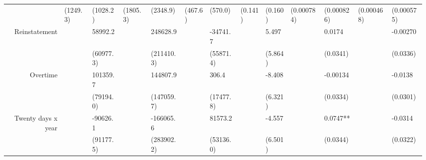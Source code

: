 \begin{tabular}{rrrrrrrrrrrrr}
      & \multicolumn{1}{l}{(1249.3)} & \multicolumn{1}{l}{(1028.2)} & \multicolumn{1}{l}{(1805.3)} & \multicolumn{1}{l}{(2348.9)} & \multicolumn{1}{l}{(467.6)} & \multicolumn{1}{l}{(570.0)} & \multicolumn{1}{l}{(0.141)} & \multicolumn{1}{l}{(0.160)} & \multicolumn{1}{l}{(0.000784)} & \multicolumn{1}{l}{(0.000826)} & \multicolumn{1}{l}{(0.000468)} & \multicolumn{1}{l}{(0.000575)} \\
Reinstatement & \multicolumn{1}{l}{} & \multicolumn{1}{l}{58992.2} & \multicolumn{1}{l}{} & \multicolumn{1}{l}{248628.9} & \multicolumn{1}{l}{} & \multicolumn{1}{l}{-34741.7} & \multicolumn{1}{l}{} & \multicolumn{1}{l}{5.497} & \multicolumn{1}{l}{} & \multicolumn{1}{l}{0.0174} & \multicolumn{1}{l}{} & \multicolumn{1}{l}{-0.00270} \\
      & \multicolumn{1}{l}{} & \multicolumn{1}{l}{(60977.3)} & \multicolumn{1}{l}{} & \multicolumn{1}{l}{(211410.3)} & \multicolumn{1}{l}{} & \multicolumn{1}{l}{(55871.4)} & \multicolumn{1}{l}{} & \multicolumn{1}{l}{(5.864)} & \multicolumn{1}{l}{} & \multicolumn{1}{l}{(0.0341)} & \multicolumn{1}{l}{} & \multicolumn{1}{l}{(0.0336)} \\
Overtime & \multicolumn{1}{l}{} & \multicolumn{1}{l}{101359.7} & \multicolumn{1}{l}{} & \multicolumn{1}{l}{144807.9} & \multicolumn{1}{l}{} & \multicolumn{1}{l}{306.4} & \multicolumn{1}{l}{} & \multicolumn{1}{l}{-8.408} & \multicolumn{1}{l}{} & \multicolumn{1}{l}{-0.00134} & \multicolumn{1}{l}{} & \multicolumn{1}{l}{-0.0138} \\
      & \multicolumn{1}{l}{} & \multicolumn{1}{l}{(79194.0)} & \multicolumn{1}{l}{} & \multicolumn{1}{l}{(147059.7)} & \multicolumn{1}{l}{} & \multicolumn{1}{l}{(17477.8)} & \multicolumn{1}{l}{} & \multicolumn{1}{l}{(6.321)} & \multicolumn{1}{l}{} & \multicolumn{1}{l}{(0.0334)} & \multicolumn{1}{l}{} & \multicolumn{1}{l}{(0.0301)} \\
Twenty days x year & \multicolumn{1}{l}{} & \multicolumn{1}{l}{-90626.1} & \multicolumn{1}{l}{} & \multicolumn{1}{l}{-166065.6} & \multicolumn{1}{l}{} & \multicolumn{1}{l}{81573.2} & \multicolumn{1}{l}{} & \multicolumn{1}{l}{-4.557} & \multicolumn{1}{l}{} & \multicolumn{1}{l}{0.0747**} & \multicolumn{1}{l}{} & \multicolumn{1}{l}{-0.0314} \\
      & \multicolumn{1}{l}{} & \multicolumn{1}{l}{(91177.5)} & \multicolumn{1}{l}{} & \multicolumn{1}{l}{(283902.2)} & \multicolumn{1}{l}{} & \multicolumn{1}{l}{(53136.0)} & \multicolumn{1}{l}{} & \multicolumn{1}{l}{(6.501)} & \multicolumn{1}{l}{} & \multicolumn{1}{l}{(0.0344)} & \multicolumn{1}{l}{} & \multicolumn{1}{l}{(0.0322)} \\

\end{tabular}
